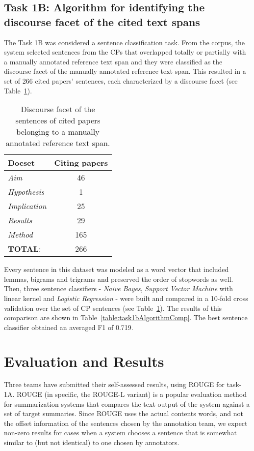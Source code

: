 \documentclass[11pt]{article}
\begin{document}
\subsection{Task 1B: Algorithm for identifying the discourse facet of the	cited text spans}
The Task 1B was considered a sentence classification task. From the corpus, the system selected sentences from the CPs that overlapped totally or partially with a manually annotated reference text span and they were classified as the discourse facet of the manually annotated reference text span. This resulted in a set of 266 cited papers' sentences, each characterized by a discourse facet (see Table~\ref{table:task1bSentDistrib}).

\begin{table}[h]\footnotesize
  \begin{center}
  \begin{tabular}{ |l | c |}
    \hline
    Docset & Citing papers \\ \hline
    \textit{Aim} & 46 \\ \hline
    \textit{Hypothesis} & 1 \\ \hline
    \textit{Implication} & 25 \\ \hline
    \textit{Results} & 29 \\ \hline
    \textit{Method} & 165 \\ \hline
    \textbf{TOTAL}: & 266 \\ \hline
    \hline
  \end{tabular}
  \caption{Discourse facet of the sentences of cited papers belonging to a manually annotated reference text span.}
  \label{table:task1bSentDistrib}
  \end{center}
\end{table}

Every sentence in this dataset was modeled as a word vector that included lemmas, bigrams and trigrams and preserved the order of stopwords as well. Then, three sentence classifiers - \textit{Naive Bayes}, \textit{Support Vector Machine} with linear kernel and \textit{Logistic Regression} - were built and compared in a 10-fold cross validation over the set of CP sentences (see Table~\ref{table:task1bSentDistrib}). The results of this comparison are shown in Table~\ref{table:task1bAlgorithmComp}. The best sentence classifier obtained an averaged F1 of 0.719. 

\section{Evaluation and Results}
Three teams have submitted their self-assessed results, using ROUGE \cite{Lin:2004} for task-1A. ROUGE (in specific, the ROUGE-L variant) is a popular evaluation method for summarization systems that compares the text output of the system against a set of target summaries. Since ROUGE uses the actual contents words, and not the offset information of the sentences chosen by the annotation team, we expect non-zero results for cases when a system chooses a sentence that is somewhat similar to (but not identical) to one chosen by annotators.
\end{document}
